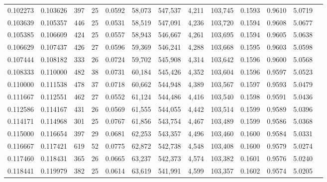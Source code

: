 \begin{tabular}{rrrrrrrrrrrrr}
0.102273 & 0.103626 &    397 &    25 &                                     0.0592 &  58,073 & 547,537 &   4,211 & 103,745 & 0.1593 & 0.9610 & 5.0719 \\
0.103639 & 0.105357 &    446 &    25 &                                     0.0531 &  58,519 & 547,091 &   4,236 & 103,720 & 0.1594 & 0.9608 & 5.0677 \\
0.105385 & 0.106609 &    424 &    25 &                                     0.0557 &  58,943 & 546,667 &   4,261 & 103,695 & 0.1594 & 0.9605 & 5.0638 \\
0.106629 & 0.107437 &    426 &    27 &                                     0.0596 &  59,369 & 546,241 &   4,288 & 103,668 & 0.1595 & 0.9603 & 5.0598 \\
0.107444 & 0.108182 &    333 &    26 &                                     0.0724 &  59,702 & 545,908 &   4,314 & 103,642 & 0.1596 & 0.9600 & 5.0568 \\
0.108333 & 0.110000 &    482 &    38 &                                     0.0731 &  60,184 & 545,426 &   4,352 & 103,604 & 0.1596 & 0.9597 & 5.0523 \\
0.110000 & 0.111538 &    478 &    37 &                                     0.0718 &  60,662 & 544,948 &   4,389 & 103,567 & 0.1597 & 0.9593 & 5.0479 \\
0.111667 & 0.112551 &    462 &    27 &                                     0.0552 &  61,124 & 544,486 &   4,416 & 103,540 & 0.1598 & 0.9591 & 5.0436 \\
0.112586 & 0.114167 &    431 &    26 &                                     0.0569 &  61,555 & 544,055 &   4,442 & 103,514 & 0.1599 & 0.9589 & 5.0396 \\
0.114171 & 0.114968 &    301 &    25 &                                     0.0767 &  61,856 & 543,754 &   4,467 & 103,489 & 0.1599 & 0.9586 & 5.0368 \\
0.115000 & 0.116654 &    397 &    29 &                                     0.0681 &  62,253 & 543,357 &   4,496 & 103,460 & 0.1600 & 0.9584 & 5.0331 \\
0.116667 & 0.117421 &    619 &    52 &                                     0.0775 &  62,872 & 542,738 &   4,548 & 103,408 & 0.1600 & 0.9579 & 5.0274 \\
0.117460 & 0.118431 &    365 &    26 &                                     0.0665 &  63,237 & 542,373 &   4,574 & 103,382 & 0.1601 & 0.9576 & 5.0240 \\
0.118441 & 0.119979 &    382 &    25 &                                     0.0614 &  63,619 & 541,991 &   4,599 & 103,357 & 0.1602 & 0.9574 & 5.0205 \\

\end{tabular}
